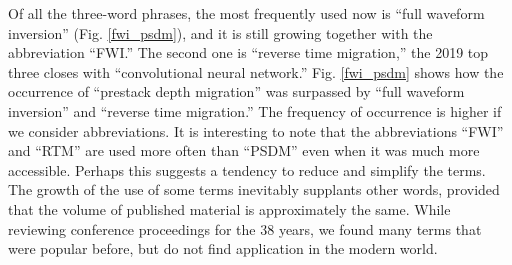 \documentclass[geosciences,article,submit,moreauthors,pdftex]{Definitions/mdpi}
\begin{document}
Of all the three-word phrases, the most frequently used now is ``full waveform inversion'' (Fig. \ref{fwi_psdm}), and it is still growing together with the abbreviation ``FWI.'' The second one is ``reverse time migration,'' the 2019 top three closes with ``convolutional neural network.'' Fig. \ref{fwi_psdm} shows how the occurrence of ``prestack depth migration'' was surpassed by ``full waveform inversion'' and ``reverse time migration.'' The frequency of occurrence is higher if we consider abbreviations. It is interesting to note that the abbreviations ``FWI'' and ``RTM'' are used more often than ``PSDM'' even when it was much more accessible. Perhaps this suggests a tendency to reduce and simplify the terms. The growth of the use of some terms inevitably supplants other words, provided that the volume of published material is approximately the same. While reviewing conference proceedings for the 38 years, we found many terms that were popular before, but do not find application in the modern world. 
\end{document}
